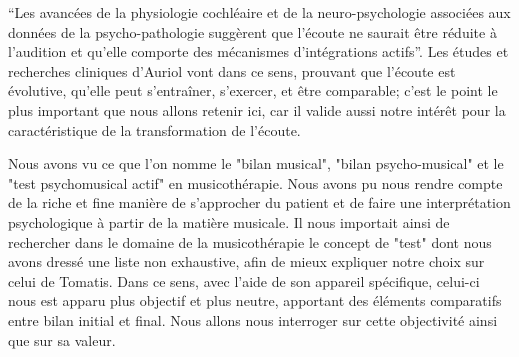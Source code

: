 \enquote {Les avancées de la physiologie cochléaire et de la neuro-psychologie associées aux données 
de la psycho-pathologie suggèrent que l'écoute ne saurait être réduite à l'audition et qu'elle comporte 
des mécanismes d'intégrations actifs}\autocite[58]{auriol:cle}. Les études et recherches cliniques 
d'Auriol vont dans ce sens, prouvant que l'écoute est évolutive, qu'elle peut  s'entraîner, s'exercer, et  
être comparable;  
c'est le point le plus important que nous allons retenir ici,  car il valide aussi notre intérêt pour la 
caractéristique de la transformation de l'écoute. %

Nous avons vu ce que l'on nomme le "bilan musical", "bilan psycho-musical" et le  "test psychomusical 
actif" en musicothérapie. Nous avons pu nous rendre compte de la riche et fine manière de s'approcher 
du patient et de faire  une interprétation psychologique à partir de la matière musicale.
Il nous importait ainsi de rechercher dans le domaine de la musicothérapie le concept de "test" dont 
nous 
avons dressé une  liste non exhaustive, %
 afin de mieux 
expliquer notre choix sur celui de  Tomatis. Dans ce sens, avec 
l'aide de son 
appareil spécifique, celui-ci nous est apparu 
plus objectif et plus neutre, apportant 
des éléments comparatifs entre bilan initial et final.
Nous allons nous interroger sur cette 
objectivité ainsi que  sur sa valeur.



